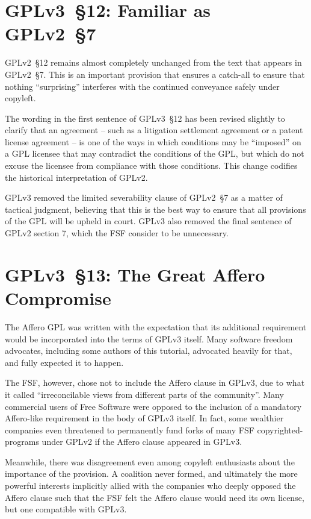 \section{GPLv3~\S12: Familiar as GPLv2~\S7}
\label{GPLv3s12}

GPLv2~\S12 remains almost completely unchanged from the text that appears in
GPLv2~\S7.  This is an important provision that ensures a catch-all to ensure
that nothing ``surprising'' interferes with the continued conveyance safely
under copyleft.

The wording in the first sentence of GPLv3~\S12 has been revised slightly to
clarify that an agreement -- such as a litigation settlement agreement or a
patent license agreement -- is one of the ways in which conditions may be
``imposed'' on a GPL licensee that may contradict the conditions of the GPL,
but which do not excuse the licensee from compliance with those conditions.
This change codifies the historical interpretation of GPLv2.

GPLv3 removed the limited severability clause of GPLv2~\S7 as a
matter of tactical judgment, believing that this is the best way to ensure
that all provisions of the GPL will be upheld in court. GPLv3 also removed
the final sentence of GPLv2 section 7, which the FSF consider to be unnecessary.

\section{GPLv3~\S13: The Great Affero Compromise}

The Affero GPL was written with the expectation that its
additional requirement would be incorporated into the terms of GPLv3
itself.  Many software freedom advocates, including some authors of this
tutorial, advocated heavily for that, and fully expected it to happen.

The FSF, however, chose not to include the Affero clause in GPLv3, due to
what it called  ``irreconcilable views from
different parts of the community''.  Many
commercial users of Free Software were opposed to the inclusion of a
mandatory Affero-like requirement in the body of GPLv3 itself.  In fact, some
wealthier companies even threatened to permanently fund forks of many FSF
copyrighted-programs under GPLv2 if the Affero clause appeared in GPLv3.

Meanwhile, there was disagreement even among copyleft enthusiasts about the
importance of the provision.  A coalition never formed, and ultimately the
more powerful interests implicitly allied with the companies who deeply opposed
the Affero clause such that the FSF felt the Affero clause would need its own
license, but one compatible with GPLv3. 

